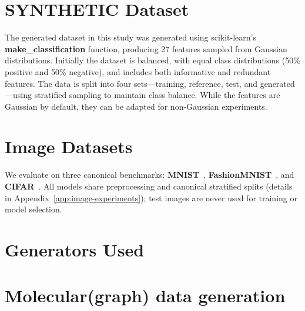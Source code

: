\section{SYNTHETIC Dataset}
The generated dataset in this study was generated using scikit-learn's \textbf{make\_classification} function, producing 27 features sampled from Gaussian distributions. Initially the dataset is balanced, with equal class distributions (50\% positive and 50\% negative), and includes both informative and redundant features. The data is split into four sets---training, reference, test, and generated---using stratified sampling to maintain class balance.  While the features are Gaussian by default, they can be adapted for non-Gaussian experiments. 


\section{Image Datasets}
We evaluate on three canonical benchmarks: \textbf{MNIST}~\citep{lecun1998gradient},
\textbf{Fashion\textendash MNIST}~\citep{xiao2017fashion}, and \textbf{CIFAR}~\citep{krizhevsky2009learning}.
All models share preprocessing and canonical stratified splits
(details in Appendix~\ref{app:image-experiments});
test images are never used for training or model selection.



\section{Generators Used}
\label{app:generators}

\section{Molecular(graph) data generation}
\label{app:molecular_generators}

